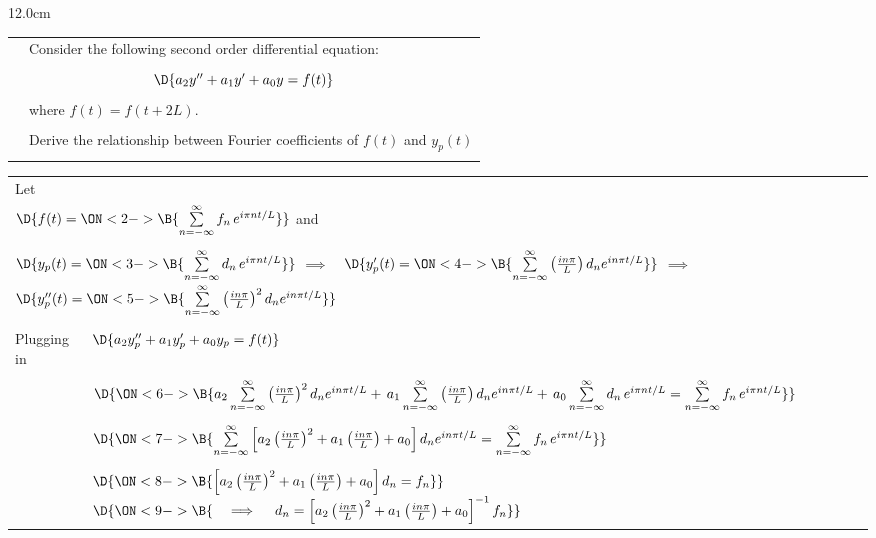 \begin{frame}
\scriptsize
\begin{columns}\begin{column}{12.0cm}

{\setlength{\extrarowheight}{-0.1cm}
\begin{tabular}{p{0.15cm}p{11.6cm}}
	\EX & Consider the following second order differential equation: \\
	&\\
	\multicolumn{2}{c}{$\D{a_2y'' + a_{1}y' + a_0 y = f(t)}$} \\
	&\\
	& where $f(t)=f(t+2L)$. \\
	&\\
	& Derive the relationship between Fourier coefficients of $f(t)$ and $y_p(t)$\\
	&\\
\end{tabular}}
{\setlength{\extrarowheight}{-0.1cm}
\begin{tabular}{p{1.45cm}p{10.6cm}}
	Let & \\
	\multicolumn{2}{l}{$\D{f(t) = 
	\ON<2->{\B{ \sum \limits_{n=-\infty}^{\infty} f_n \, e^{i\pi nt/L}}}}$ \qquad and } \\
	&\\
	\multicolumn{2}{l}{
	$\D{y_p(t) = 
	\ON<3->{\B{\sum \limits_{n=-\infty}^{\infty} d_n \, e^{i\pi nt/L}}} }$ \qquad $\implies$ \,\,
	$\D{y_p'(t) = 
	\ON<4->{\B{\sum \limits_{n=-\infty}^{\infty} \left(\frac{in\pi}{L}\right)d_n e^{in\pi t/L}}} }$ \qquad $\implies$ \,\,
	$\D{y_p''(t) = 
	\ON<5->{\B{\sum \limits_{n=-\infty}^{\infty} \left(\frac{in\pi}{L}\right)^2 d_n e^{in\pi t/L}}} }$} \\
	&\\
	Plugging in & $\D{a_2y_p'' + a_{1}y_p' + a_0 y_p = f(t)}$ \\
	&\\
	& 
	$\D{
	\ON<6->{\B{
	a_2 \sum \limits_{n=-\infty}^{\infty} \left(\frac{in\pi}{L}\right)^2 d_n e^{in\pi t/L} + \,
	a_1 \sum \limits_{n=-\infty}^{\infty} \left(\frac{in\pi}{L}\right)d_n e^{in\pi t/L} + \,
	a_0 \sum \limits_{n=-\infty}^{\infty} d_n \, e^{i\pi nt/L} = 
	    \sum \limits_{n=-\infty}^{\infty} f_n \, e^{i\pi nt/L} }}}$ \\
	&\\
	& 
	$\D{
	\ON<7->{\B{\sum \limits_{n=-\infty}^{\infty} \left[a_2 \left(\frac{in\pi}{L}\right)^2 + a_1 \left(\frac{in\pi}{L}\right) + a_0 \right] d_n e^{in\pi t/L} = 
	    \sum \limits_{n=-\infty}^{\infty} f_n \, e^{i\pi nt/L} }} }$ \\
	&\\
	& $\D{
	\ON<8->{\B{\left[a_2 \left(\frac{in\pi}{L}\right)^2 + a_1\left(\frac{in\pi}{L}\right) + a_0 \right]d_n = f_n }} }$
	$\D{
	\ON<9->{\B{\quad \implies \quad d_n = \left[a_2 \left(\frac{in\pi}{L}\right)^2 + a_1\left(\frac{in\pi}{L}\right) + a_0 \right]^{-1} f_n}}}$ \\
\end{tabular}}


\end{column}
\end{columns}
\end{frame}
